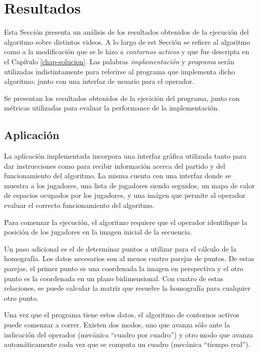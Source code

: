 \chapter{Resultados}
\label{chap-results}

Esta Sección presenta un análisis de los resultados obtenidos de la ejecución
del algoritmo sobre distintos videos. A lo largo de est Sección se refiere al
algoritmo como a la modificación que se le hizo a \textit{contornos activos} y
que fue descripta en el Capítulo \ref{chap-solucion}. Las palabras
\textit{implamentación} y \textit{programa} serán utilizadas indistintamente
para referirse al programa que implementa dicho algoritmo, junto con una
interfaz de usuario para el operador.

Se presentan los resultados obtenidos de la ejecición del programa, junto con
métricas utilizadas para evaluar la performance de la implementación. 

\section{Aplicación}

La aplicación implementada incorpora una interfaz gráfica utilizada tanto para dar instrucciones como para recibir información acerca del partido y del funcionamiento del algoritmo. La misma cuenta con una interfaz donde se muestra a los jugadores, una lista de jugadores siendo seguidos, un mapa de calor de espacios ocupados por los jugadores, y una imágen que permite al operador evaluar el correcto funcionamiento del algoritmo.

Para comenzar la ejecución, el algoritmo requiere que el operador identifique la posición de los jugadores en la imagen inicial de la secuencia. %

Un paso adicional es el de determinar puntos a utilizar para el cálculo de la homografía. Los datos necesarios son al menos cuatro parejas de puntos. De estas parejas, el primer punto es una coordenada la imagen en perspectiva y el otro punto es la coordenada
en un plano bidimensional. Con cuatro de estas relaciones, se puede calcular la matriz que resuelve la homografía para cualquier otro punto. %

Una vez que el programa tiene estos datos, el algoritmo de contornos activos puede comenzar a correr. Existen dos modos, uno que avanza sólo ante la indicación del operador (mecánica ``cuadro por cuadro'') y otro modo que avanza automáticamente cada vez que se computa un cuadro (mecánica ``tiempo real''). %

